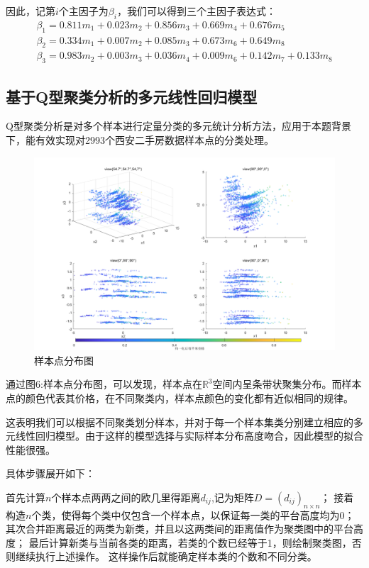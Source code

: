 \documentclass[withoutpreface,bwprint]{cumcmthesis} %
\begin{document}
因此，记第$i$个主因子为$\beta_{i}$，我们可以得到三个主因子表达式：
\begin{gather}
   \beta _{1}=0.811m_{1}+0.023m_{2}+0.856m_{3}+0.669m_{4}+0.676m_{5}\\
   \beta _{2}=0.334m_{1}+0.007m_{2}+0.085m_{3}+0.673m_{6}+0.649m_{8}\\
   \beta _{3}=0.983m_{2}+0.003m_{3}+0.036m_{4}+0.009m_{6}+0.142m_{7}+0.133m_{8}
\end{gather}
                                    
\subsection{基于Q型聚类分析的多元线性回归模型}

Q型聚类分析是对多个样本进行定量分类的多元统计分析方法，应用于本题背景下，能有效实现对2993个西安二手房数据样本点的分类处理。
\begin{figure}[H]
    \centering
    \includegraphics[scale=0.35]{不同角度的样本点分布图.png}
    \caption{样本点分布图}
    \label{样本点分布图}
\end{figure}
通过图6:样本点分布图，可以发现，样本点在$\mathbb{R}^3$空间内呈条带状聚集分布。而样本点的颜色代表其价格，在不同聚类内，样本点颜色的变化都有近似相同的规律。

这表明我们可以根据不同聚类划分样本，并对于每一个样本集类分别建立相应的多元线性回归模型。由于这样的模型选择与实际样本分布高度吻合，因此模型的拟合性能很强。



具体步骤展开如下：

   首先计算$n$个样本点两两之间的欧几里得距离$d_{ij}$,记为矩阵$D=(d_{ij})_{n\times n}$；
  接着构造$n$个类，使得每个类中仅包含一个样本点，以保证每一类的平台高度均为0；
    其次合并距离最近的两类为新类，并且以这两类间的距离值作为聚类图中的平台高度；
    最后计算新类与当前各类的距离，若类的个数已经等于1，则绘制聚类图，否则继续执行上述操作。
    这样操作后就能确定样本类的个数和不同分类。
\end{document}
